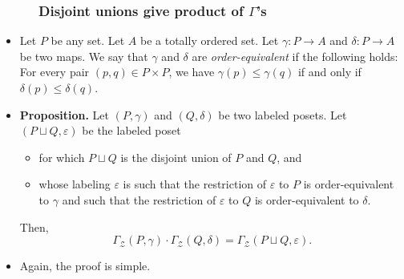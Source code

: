 \documentclass{beamer}
\newcommand{\fti}[1]{\frametitle{\ \ \ \ \ #1}}
\newcommand{\defn}[1]{{\color{darkred}\emph{#1}}} %
\theoremstyle{plain}
\begin{document}
\begin{frame}
\fti{Disjoint unions give product of $\Gamma$'s}

\begin{itemize}

\item Let $P$ be any set. Let $A$ be a totally ordered set. Let $\gamma:P\rightarrow
A$ and $\delta:P\rightarrow A$ be two maps. We say that $\gamma$ and $\delta$
are \defn{order-equivalent} if the following holds: For every pair $\left(
p,q\right)  \in P\times P$, we have $\gamma\left(  p\right)  \leq\gamma\left(
q\right)  $ if and only if $\delta\left(  p\right)  \leq\delta\left(
q\right)  $.

\pause

\item \textbf{Proposition.} Let $\left(  P,\gamma\right)  $ and $\left(  Q,\delta
\right)  $ be two labeled posets. Let $\left(  P\sqcup Q,\varepsilon\right)  $
be the labeled poset
\begin{itemize}
\item for which $P\sqcup Q$ is the disjoint union of
$P$ and $Q$, and
\item whose labeling $\varepsilon$ is such that the restriction of
$\varepsilon$ to $P$ is order-equivalent to $\gamma$ and such that the
restriction of $\varepsilon$ to $Q$ is order-equivalent to $\delta$.
\end{itemize}
Then,%
\[
\Gamma_{\mathcal{Z}}\left(  P,\gamma\right)  \cdot
\Gamma_{\mathcal{Z}}\left(
Q,\delta\right)  =\Gamma_{\mathcal{Z}}\left(  P\sqcup Q,\varepsilon\right)  .
\]

\item Again, the proof is simple.

\end{itemize}

\end{frame}
\end{document}
